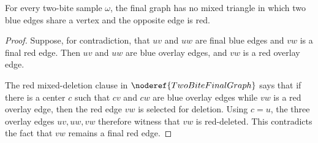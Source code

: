 \begin{helper}
For every two-bite sample \(\omega\), the final graph has no mixed triangle in
which two blue edges share a vertex and the opposite edge is red.
\end{helper}
\begin{proof}
Suppose, for contradiction, that \(uv\) and \(uw\) are final blue edges and
\(vw\) is a final red edge.  Then \(uv\) and \(uw\) are blue overlay edges, and
\(vw\) is a red overlay edge.

The red mixed-deletion clause in \(\noderef{TwoBiteFinalGraph}\) says that if
there is a center \(c\) such that \(cv\) and \(cw\) are blue overlay edges while
\(vw\) is a red overlay edge, then the red edge \(vw\) is selected for deletion.
Using \(c=u\), the three overlay edges \(uv,uw,vw\) therefore witness that
\(vw\) is red-deleted.  This contradicts the fact that \(vw\) remains a final
red edge.
\end{proof}
